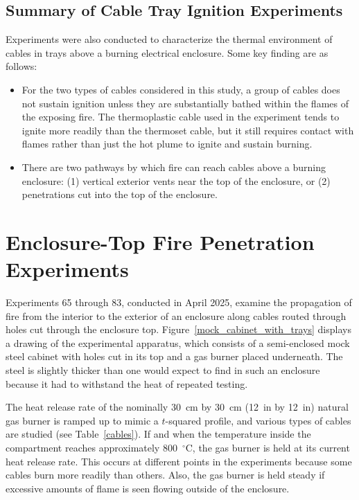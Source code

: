\clearpage


\subsection{Summary of Cable Tray Ignition Experiments}


Experiments were also conducted to characterize the thermal environment of cables in trays above a burning electrical enclosure. Some key finding are as follows:
\begin{itemize}
\item For the two types of cables considered in this study, a group of cables does not sustain ignition unless they are substantially bathed within the flames of the exposing fire. The thermoplastic cable used in the experiment tends to ignite more readily than the thermoset cable, but it still requires contact with flames rather than just the hot plume to ignite and sustain burning.
\item There are two pathways by which fire can reach cables above a burning enclosure: (1) vertical exterior vents near the top of the enclosure, or (2) penetrations cut into the top of the enclosure.
\end{itemize}


\clearpage

\section{Enclosure-Top Fire Penetration Experiments}

Experiments 65 through 83, conducted in April 2025, examine the propagation of fire from the interior to the exterior of an enclosure along cables routed through holes cut through the enclosure top. Figure~\ref{mock_cabinet_with_trays} displays a drawing of the experimental apparatus, which consists of a semi-enclosed mock steel cabinet with holes cut in its top and a gas burner placed underneath. The steel is slightly thicker than one would expect to find in such an enclosure because it had to withstand the heat of repeated testing.

The heat release rate of the nominally 30~cm by 30~cm (12~in by 12~in) natural gas burner is ramped up to mimic a $t$-squared profile, and various types of cables are studied (see Table~\ref{cables}). If and when the temperature inside the compartment reaches approximately 800~$^\circ$C, the gas burner is held at its current heat release rate. This occurs at different points in the experiments because some cables burn more readily than others. Also, the gas burner is held steady if excessive amounts of flame is seen flowing outside of the enclosure.

